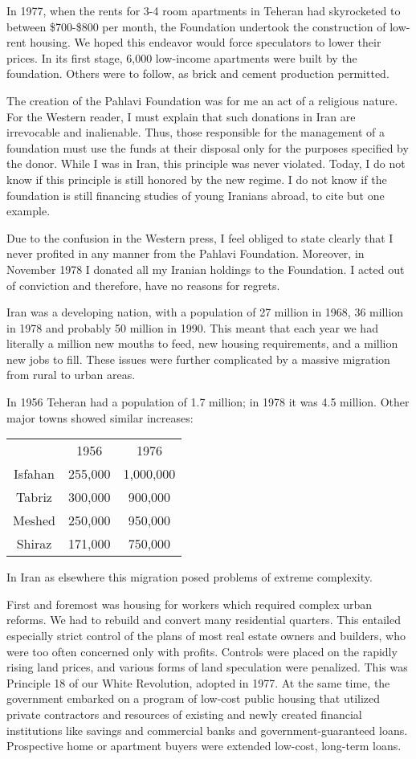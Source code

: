 In 1977, when the rents for 3-4 room apartments in Teheran had skyrocketed to between \$700-\$800 per month, the Foundation undertook the construction of low-rent housing. We hoped this endeavor would force speculators to lower their prices. In its first stage, 6,000 low-income apartments were built by the foundation. Others were to follow, as brick and cement production permitted. 

The creation of the Pahlavi Foundation was for me an act of a religious nature. For the Western reader, I must explain that such donations in Iran are irrevocable and inalienable. Thus, those responsible for the management of a foundation must use the funds at their disposal only for the purposes specified by the donor. While I was in Iran, this principle was never violated. Today, I do not know if this principle is still honored by the new regime. I do not know if the foundation is still financing studies of young Iranians abroad, to cite but one example. 

Due to the confusion in the Western press, I feel obliged to state clearly that I never profited in any manner from the Pahlavi Foundation. Moreover, in November 1978 I donated all my Iranian holdings to the Foundation. I acted out of conviction and therefore, have no reasons for regrets. 


Iran was a developing nation, with a population of 27 million in 1968, 36 million in 1978 and probably 50 million in 1990. This meant that each year we had literally a million new mouths to feed, new housing requirements, and a million new jobs to fill. These issues were further complicated by a massive migration from rural to urban areas. 

In 1956 Teheran had a population of 1.7 million; in 1978 it was 4.5 million. Other major towns showed similar increases: 

    \begin{tabular}{ccc}
          & 1956  & 1976 \\
    Isfahan & 255,000 & 1,000,000 \\
    Tabriz & 300,000 & 900,000 \\
    Meshed & 250,000 & 950,000 \\
    Shiraz & 171,000 & 750,000 \\
    \end{tabular}%

In Iran as elsewhere this migration posed problems of extreme complexity. 

First and foremost was housing for workers which required complex urban reforms. We had to rebuild and convert many residential quarters. This entailed especially strict control of the plans of most real estate owners and builders, who were too often concerned only with profits. Controls were placed on the rapidly rising land prices, and various forms of land speculation were penalized. This was Principle 18 of our White Revolution, adopted in 1977. At the same time, the government embarked on a program of low-cost public housing that utilized private contractors and resources of existing and newly created financial institutions like savings and commercial banks and government-guaranteed loans. Prospective home or apartment buyers were extended low-cost, long-term loans. 

